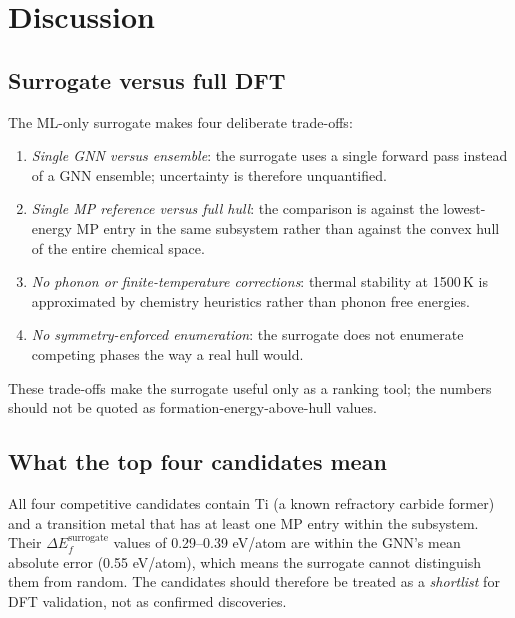 \documentclass[11pt,a4paper]{article}
\begin{document}
\section{Discussion}
\label{sec:discussion}

\subsection{Surrogate versus full DFT}

The ML-only surrogate makes four deliberate trade-offs:
\begin{enumerate}[noitemsep]
  \item \emph{Single GNN versus ensemble}: the surrogate uses a single
        forward pass instead of a GNN ensemble; uncertainty is therefore
        unquantified.
  \item \emph{Single MP reference versus full hull}: the comparison is
        against the lowest-energy MP entry in the same subsystem rather
        than against the convex hull of the entire chemical space.
  \item \emph{No phonon or finite-temperature corrections}: thermal
        stability at 1500\,K is approximated by chemistry heuristics
        rather than phonon free energies.
  \item \emph{No symmetry-enforced enumeration}: the surrogate does not
        enumerate competing phases the way a real hull would.
\end{enumerate}
These trade-offs make the surrogate useful only as a ranking tool;
the numbers should not be quoted as formation-energy-above-hull
values.

\subsection{What the top four candidates mean}

All four competitive candidates contain Ti (a known refractory carbide
former) and a transition metal that has at least one MP entry within
the subsystem. Their $\Delta E_f^{\mathrm{surrogate}}$ values of
0.29--0.39 eV/atom are within the GNN's mean absolute error
(0.55 eV/atom), which means the surrogate cannot distinguish them
from random. The candidates should therefore be treated as a
\emph{shortlist} for DFT validation, not as confirmed discoveries.
\end{document}
